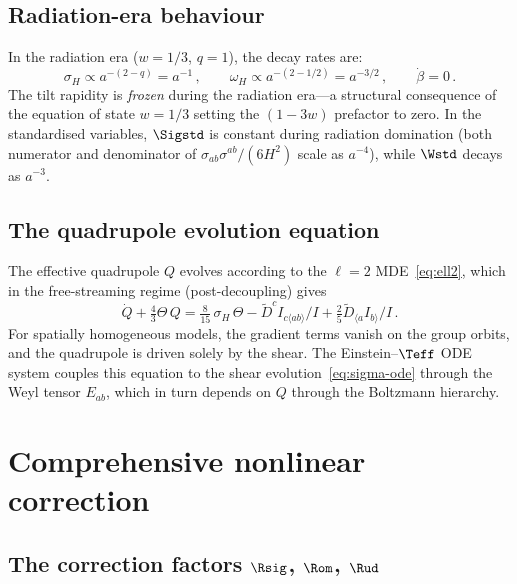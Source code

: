 \subsection{Radiation-era behaviour}\label{sec:rad-era}

In the radiation era ($w = 1/3$, $q = 1$), the decay rates are:
\begin{equation}\label{eq:rad-decay}
\sigma_H \propto a^{-(2-q)} = a^{-1}\,,\qquad
\omega_H \propto a^{-(2-1/2)} = a^{-3/2}\,,\qquad
\dot{\beta} = 0\,.
\end{equation}
The tilt rapidity is \emph{frozen} during the radiation era---a
structural consequence of the equation of state $w = 1/3$
setting the $(1 - 3w)$ prefactor to zero.  In the standardised
variables, $\Sigstd$ is constant during radiation domination
(both numerator and denominator of
$\sigma_{ab}\sigma^{ab}/(6H^2)$ scale as $a^{-4}$), while
$\Wstd$ decays as $a^{-3}$.


\subsection{The quadrupole evolution equation}
\label{sec:Q-dot}

The effective quadrupole $Q$ evolves according to the $\ell = 2$
MDE~\eqref{eq:ell2}, which in the free-streaming regime
(post-decoupling) gives
\begin{equation}\label{eq:Q-ode}
\dot{Q} + \tfrac{4}{3}\Theta\,Q
= \tfrac{8}{15}\,\sigma_H\,\Theta
  - \tilde{D}^c I_{c\langle ab\rangle}/I
  + \tfrac{2}{5}\tilde{D}_{\langle a}I_{b\rangle}/I\,.
\end{equation}
For spatially homogeneous models, the gradient terms vanish on
the group orbits, and the quadrupole is driven solely by the
shear.  The Einstein--$\Teff$ ODE system couples this equation
to the shear evolution~\eqref{eq:sigma-ode} through the Weyl
tensor $E_{ab}$, which in turn depends on $Q$ through the
Boltzmann hierarchy.


\section{Comprehensive nonlinear correction}
\label{sec:comprehensive}

\subsection{The correction factors $\Rsig$, $\Rom$, $\Rud$}
\label{sec:R-factors}

